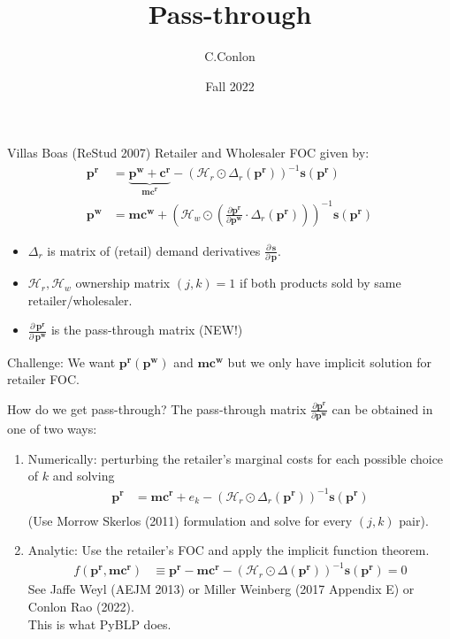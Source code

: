 \documentclass[aspectratio=169,11pt]{beamer}
\title []{Pass-through}
\author{C.Conlon }
\institute{Internal Notes }
\date{Fall 2022}
\begin{document}
\begin{frame}
\titlepage
\end{frame}






\begin{frame}{Villas Boas (ReStud 2007)}
Retailer and Wholesaler FOC given by:
\begin{align*}
\symbf{p^r} &= \underbrace{\symbf{p^w} +\symbf{c^r}}_{\symbf{mc^r}} -(\mathcal{H}_r \odot \Delta_{r}(\symbf{p^r}))^{-1} \symbf{s}(\symbf{p^r})\\
\symbf{p^w}  &= \symbf{mc^w} + \left(\mathcal{H}_{w} \odot \left( \frac{\partial \symbf{p^r}}{\partial \symbf{p^w}} \cdot  \Delta_r(\symbf{p^r} ) \right) \right)^{-1} \symbf{s}(\symbf{p^r})
\end{align*}
\begin{itemize}
  \item $\Delta_r$ is matrix of (retail) demand derivatives $\frac{\partial\, \symbf{s}}{\partial\, \symbf{p}}$.
\item $\mathcal{H}_r,\mathcal{H}_w$  ownership matrix $(j,k)=1$ if both products sold by same retailer/wholesaler.
\item $\frac{\partial\, \symbf{p^r}}{\partial\, \symbf{p^w}}$ is the \alert{pass-through matrix} (NEW!)
\end{itemize}
Challenge: We want $\symbf{p^r}(\symbf{p^w})$ and $\symbf{mc^w}$ but we only have implicit solution for retailer FOC.
\end{frame}

\begin{frame}{How do we get pass-through?}
The \alert{pass-through matrix} $\frac{\partial \symbf{p^r}}{\partial \symbf{p^w}}$ can be obtained in one of two ways:
\begin{enumerate}
\item Numerically: perturbing the retailer's marginal costs for each possible choice of $k$ and solving
\begin{align*}
\symbf{p^r} &=\symbf{mc^r} + e_k -(\mathcal{H}_r \odot \Delta_{r}(\symbf{p^r}))^{-1} \symbf{s}(\symbf{p^r})\\
\end{align*}
(Use Morrow Skerlos (2011) formulation and solve for every $(j,k)$ pair).
\item Analytic: Use the retailer's FOC and apply the implicit function theorem.
\begin{align}
\tag{retailer FOC}
 f(\symbf{p^r},\symbf{mc^r}) &\equiv \symbf{p^r}  - \symbf{mc^r}-  \left(\mathcal{H}_{r} \odot \Delta(\symbf{p^r}) \right)^{-1} \symbf{s}(\symbf{p^r})=0 
\end{align}
See Jaffe Weyl (AEJM 2013) or Miller Weinberg (2017 Appendix E) or Conlon Rao (2022).\\
\alert{This is what PyBLP does}.
  \end{enumerate}

\end{frame}
\end{document}
